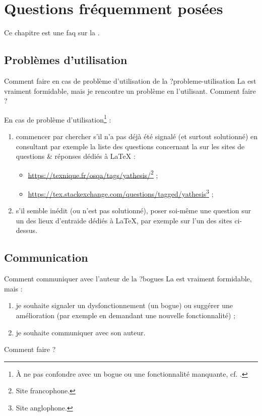 \chapter{Questions fréquemment posées}\label{cha-faq}

Ce chapitre est une \gls{faq}  sur la \yatCl{}.

\section{Problèmes d'utilisation}

\begin{dbfaq}{Comment faire en cas de problème d'utilisation de la \yatCl{} ?}{probleme-utilisation}
  La \yatCl{} est vraiment formidable, mais je rencontre un problème en
  l'utilisant.  Comment faire ?
\end{dbfaq}

En cas de problème d'utilisation\footnote{À ne pas confondre avec un bogue ou
  une fonctionnalité manquante, cf. .} :
\begin{enumerate}
\item commencer par chercher s'il n'a pas déjà été signalé (et surtout
  solutionné) en consultant par exemple la liste des questions concernant la
  \yatCl{} sur les sites de questions \& réponses dédiés à \LaTeX{} :
  \begin{itemize}
  \item \url{https://texnique.fr/osqa/tags/yathesis/}\footnote{Site
      francophone.} ;
  \item
    \url{https://tex.stackexchange.com/questions/tagged/yathesis}\footnote{Site
      anglophone.} ;
  \end{itemize}
\item s'il semble inédit (ou n'est pas  solutionné), poser
  soi-même une question sur un des lieux d'entraide dédiés à \LaTeX{}, par
  exemple sur l'un des sites ci-dessus\ecm{}.
\end{enumerate}

\section{Communication}
\label{sec-communication}

\begin{dbfaq}{Comment communiquer avec l'auteur de la \yatCl{} ?}{bogues}
  La \yatCl{} est vraiment formidable, mais :
  \begin{enumerate}
  \item je souhaite signaler un dysfonctionnement (un bogue) ou suggérer une
    amélioration (par exemple en demandant une nouvelle fonctionnalité) ;
  \item je souhaite communiquer avec son auteur.
  \end{enumerate}
  Comment faire ?
\end{dbfaq}

